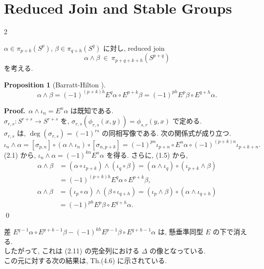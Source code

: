 \documentclass[10pt, leqno]{ltjsarticle}
\numberwithin{equation}{section}
\theoremstyle{plain}
\newtheorem{proposition}[theorem]{Proposition}
\theoremstyle{definition}
\theoremstyle{remark}
\begin{document}
\setcounter{section}{2}
\section{Reduced Join and Stable Groups}

\begin{paracol}{2}

$\alpha\in\pi_{p+k}(S^p)$, $\beta\in\pi_{q+h}(S^q)$ に対し, 
reduced join
\[
\alpha \wedge \beta\ \in\ \pi_{p+q+k+h}(S^{p+q})
\]
を考える. 

\begin{proposition}[Barratt-Hilton \cite{BarrattHilton1953}]\label{prop:3.1}
\[
\alpha \wedge \beta
= (-1)^{(p+k)h} E^{q}\alpha \circ E^{p+k}\beta
= (-1)^{ph} E^{p}\beta \circ E^{q+h}\alpha .
\]
\end{proposition}

\noindent
\textbf{Proof.}\
$\alpha \wedge \iota_n = E^{n}\alpha$ は既知である. \\
$\sigma_{r,s}:S^{r+s}\to S^{r+s}$ を,
\(\sigma_{r,s}(\phi_{r,s}(x,y)) = \phi_{s,r}(y,x)\) で定める.\\
\(\sigma_{r,s}\) は, 
$\deg(\sigma_{r,s})=(-1)^{rs}$ の同相写像である. 
次の関係式が成り立つ.
\[
\iota_n \wedge \alpha
= [\sigma_{p,n}] \circ (\alpha \wedge \iota_n) \circ [\sigma_{n,p+k}]
= (-1)^{pn}\iota_{p+n}\circ E^n\alpha\circ (-1)^{(p+k)n}\iota_{p+k+n}.
\]
(2.1) から,
\(
\iota_n \wedge \alpha = (-1)^{kn} E^{n}\alpha
\)
を得る. さらに, (1.5) から,
\[
\begin{align*}
\alpha \wedge \beta
& = (\alpha\circ\iota_{p+k}) \wedge (\iota_q\circ\beta)
= (\alpha \wedge \iota_q) \circ (\iota_{p+k} \wedge \beta)\\
& = (-1)^{(p+k)h} E^{q}\alpha \circ E^{p+k}\beta,
\end{align*}
\]
\[
\begin{align*}
\alpha \wedge \beta
& = (\iota_p\circ \alpha) \wedge (\beta\circ \iota_{q+h})
= (\iota_p\wedge \beta) \circ (\alpha\wedge\iota_{q+h})\\
& = (-1)^{ph} E^{p}\beta\circ E^{q+h}\alpha.
\end{align*}
\]
\qed

差
\(
E^{q-1}\alpha \circ E^{p+k-1}\beta
 - (-1)^{kh} E^{p-1}\beta \circ E^{q+h-1}\alpha
\)
は, 懸垂準同型 $E$ の下で消える. \\
したがって, これは (2.11) の完全列における
$\Delta$ の像となっている.\\ 
この元に対する次の結果は, \cite{Toda1957} Th.(4.6) に示されている. 


\end{paracol}
\end{document}
